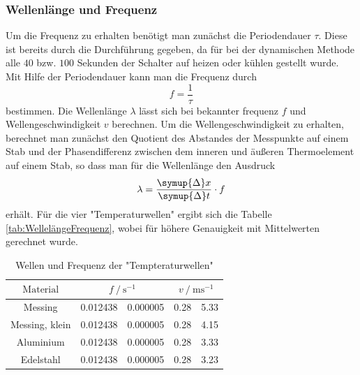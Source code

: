 \subsubsection{Wellenlänge und Frequenz}
Um die Frequenz zu erhalten benötigt man zunächst die Periodendauer $\tau$. Diese ist bereits durch die Durchführung gegeben,
da für bei der dynamischen Methode alle $40$ bzw. $100$ Sekunden der Schalter auf heizen oder kühlen gestellt wurde.
Mit Hilfe der Periodendauer kann man die Frequenz durch  
\begin{equation}
  f = \frac{1}{\tau}
\end{equation}  
bestimmen. Die Wellenlänge $\lambda$ lässt sich bei bekannter frequenz $f$ und Wellengeschwindigkeit $v$ berechnen. 
Um die Wellengeschwindigkeit zu erhalten, berechnet man zunächst den Quotient des Abstandes der Messpunkte auf einem Stab und der Phasendifferenz
zwischen dem inneren und äußeren Thermoelement auf einem Stab, so dass
man für die Wellenlänge den Ausdruck
\begin{equation}
  \lambda = \frac{\symup{\Delta} x }{\symup{\Delta} t }  \cdot f
\end{equation}
erhält. Für die vier "Temperaturwellen" ergibt sich die Tabelle \eqref{tab:WellelängeFrequenz}, wobei für höhere Genauigkeit mit Mittelwerten gerechnet wurde. 
\begin{table}
  \centering
  \label{tab:WellelängeFrequenz}
  \caption{Wellen und Frequenz der "Tempteraturwellen"}
  \begin{tabular}{
    S[table-format = 14]
    S[table-format = 1.6] @{${}\pm{}$} S[table-format = 1.2]
    S[table-format = 1.2] @{${}\pm{}$} S[table-format = 1.2]}
     \toprule
     {$\text{Material}$} &
      &
      \\
     \cmidrule(lr){2-3} \cmidrule(lr){4-5}
     \midrule
     Messing        & 0.012438 & 0.000005 & 0.28 & 5.33 \\
     Messing, klein & 0.012438 & 0.000005 & 0.28 & 4.15 \\
     Aluminium      & 0.012438 & 0.000005 & 0.28 & 3.33 \\
     Edelstahl      & 0.012438 & 0.000005 & 0.28 & 3.23 \\
      \bottomrule
  \end{tabular}
\end{table}